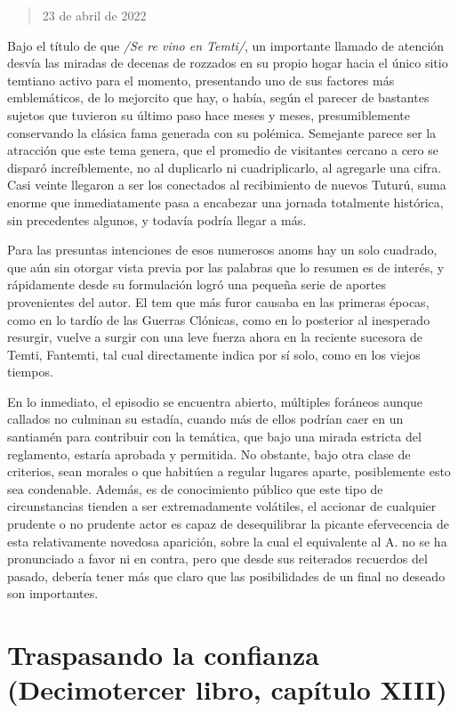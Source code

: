 \documentclass[
]{book}
\begin{document}
\begin{quote}
23 de abril de 2022
\end{quote}

Bajo el título de que \emph{/Se re vino en Temti/}, un importante llamado de atención desvía las miradas de decenas de rozzados en su propio hogar hacia el único sitio temtiano activo para el momento, presentando uno de sus factores más emblemáticos, de lo mejorcito que hay, o había, según el parecer de bastantes sujetos que tuvieron su último paso hace meses y meses, presumiblemente conservando la clásica fama generada con su polémica. Semejante parece ser la atracción que este tema genera, que el promedio de visitantes cercano a cero se disparó increíblemente, no al duplicarlo ni cuadriplicarlo, al agregarle una cifra. Casi veinte llegaron a ser los conectados al recibimiento de nuevos Tuturú, suma enorme que inmediatamente pasa a encabezar una jornada totalmente histórica, sin precedentes algunos, y todavía podría llegar a más.

Para las presuntas intenciones de esos numerosos anoms hay un solo cuadrado, que aún sin otorgar vista previa por las palabras que lo resumen es de interés, y rápidamente desde su formulación logró una pequeña serie de aportes provenientes del autor. El tem que más furor causaba en las primeras épocas, como en lo tardío de las Guerras Clónicas, como en lo posterior al inesperado resurgir, vuelve a surgir con una leve fuerza ahora en la reciente sucesora de Temti, Fantemti, tal cual directamente indica por sí solo, como en los viejos tiempos.

En lo inmediato, el episodio se encuentra abierto, múltiples foráneos aunque callados no culminan su estadía, cuando más de ellos podrían caer en un santiamén para contribuir con la temática, que bajo una mirada estricta del reglamento, estaría aprobada y permitida. No obstante, bajo otra clase de criterios, sean morales o que habitúen a regular lugares aparte, posiblemente esto sea condenable. Además, es de conocimiento público que este tipo de circunstancias tienden a ser extremadamente volátiles, el accionar de cualquier prudente o no prudente actor es capaz de desequilibrar la picante efervecencia de esta relativamente novedosa aparición, sobre la cual el equivalente al A. no se ha pronunciado a favor ni en contra, pero que desde sus reiterados recuerdos del pasado, debería tener más que claro que las posibilidades de un final no deseado son importantes.

\hypertarget{traspasando-la-confianza-decimotercer-libro-capuxedtulo-xiii}{%
\section{Traspasando la confianza (Decimotercer libro, capítulo XIII)}\label{traspasando-la-confianza-decimotercer-libro-capuxedtulo-xiii}}
\end{document}
